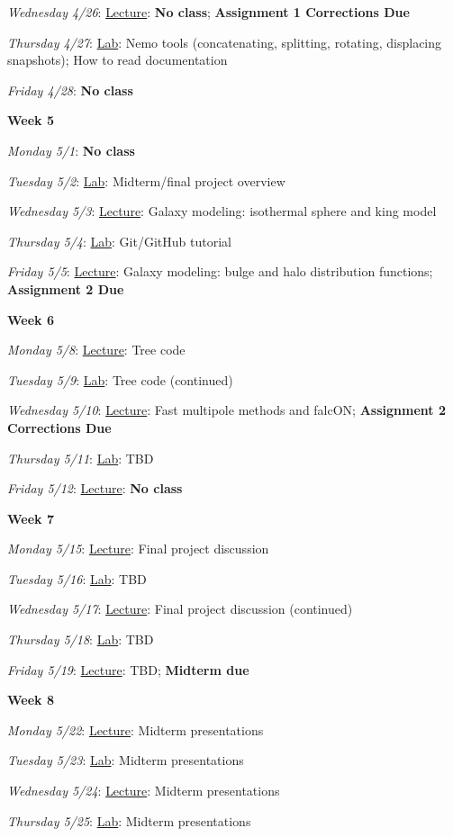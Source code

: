 \documentclass[12pt]{article}
\begin{document}
\emph{Wednesday 4/26}: \underline{Lecture}: \textbf{No class}; \textbf{Assignment 1 Corrections Due}

\emph{Thursday 4/27}: \underline{Lab}: Nemo tools (concatenating, splitting, rotating, displacing snapshots); How to read documentation

\emph{Friday 4/28}: \textbf{No class}

\noindent\textbf{Week 5}

\emph{Monday 5/1}: \textbf{No class}

\emph{Tuesday 5/2}: \underline{Lab}: Midterm/final project overview

\emph{Wednesday 5/3}: \underline{Lecture}: Galaxy modeling: isothermal sphere and king model

\emph{Thursday 5/4}: \underline{Lab}: Git/GitHub tutorial

\emph{Friday 5/5}: \underline{Lecture}: Galaxy modeling: bulge and halo distribution functions; \textbf{Assignment 2 Due}

\noindent\textbf{Week 6}

\emph{Monday 5/8}: \underline{Lecture}: Tree code

\emph{Tuesday 5/9}: \underline{Lab}: Tree code (continued)

\emph{Wednesday 5/10}: \underline{Lecture}: Fast multipole methods and falcON; \textbf{Assignment 2 Corrections Due}

\emph{Thursday 5/11}: \underline{Lab}: TBD

\emph{Friday 5/12}: \underline{Lecture}: \textbf{No class}

\noindent\textbf{Week 7}

\emph{Monday 5/15}: \underline{Lecture}: Final project discussion

\emph{Tuesday 5/16}: \underline{Lab}: TBD

\emph{Wednesday 5/17}: \underline{Lecture}: Final project discussion (continued)

\emph{Thursday 5/18}: \underline{Lab}: TBD

\emph{Friday 5/19}: \underline{Lecture}: TBD; \textbf{Midterm due}

\noindent\textbf{Week 8}

\emph{Monday 5/22}: \underline{Lecture}: Midterm presentations

\emph{Tuesday 5/23}: \underline{Lab}: Midterm presentations

\emph{Wednesday 5/24}: \underline{Lecture}: Midterm presentations

\emph{Thursday 5/25}: \underline{Lab}: Midterm presentations
\end{document}
